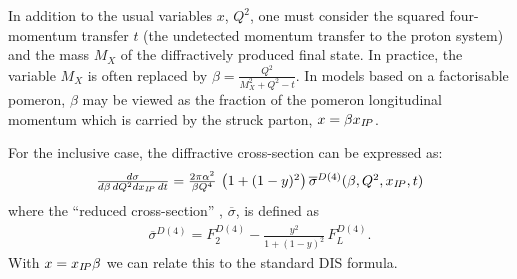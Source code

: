 In addition to the usual variables $x$, $Q^2$, one must consider the squared four-momentum transfer $t$
(the undetected momentum transfer to the proton system) and
the mass $M_X$ of the diffractively produced final state. 
In practice, the variable $M_X$ 
is often replaced by $\beta=\frac{Q^2}{M_X^2+Q^2-t}$.
%
In models based on a factorisable pomeron, $\beta$ may be viewed as the fraction of the
pomeron longitudinal momentum which is carried by the struck parton, $x=\beta x_{{I\!P}}$.

For the inclusive case, the diffractive cross-section can be expressed as:
\begin{equation}
\begin{array}{lcl}
  \frac{d\sigma}{d\beta\,dQ^2dx_{{I\!P}}\,dt}
=
  \frac{2\pi\alpha^2}{\beta Q^4}\,
    \left( 1 +  (1-y)^2 \right) \overline\sigma^{D(4)}(\beta,Q^2,x_{{I\!P}},t)
\label{Dxs}
\end{array}
\end{equation}
where the ``reduced cross-section'' , $\overline\sigma$, is defined as
\begin{equation}
\begin{array}{lcl}
\overline\sigma^{D(4)}
 = F_2^{D(4)} - \frac{y^2}{1 +  (1-y)^2}\, F_L^{D(4)}.
\label{eq:sigred}
\end{array}
\end{equation}
With $x = x_{{I\!P}}\beta$ we can relate this to the standard DIS formula.
